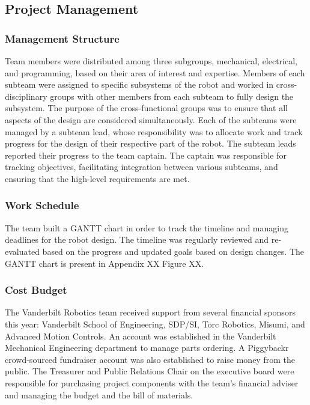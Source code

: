 \documentclass[class=article, crop=false]{standalone}
\begin{document}
	\subsection{Project Management}
	\label{subsec:project_management}
	
	\subsubsection{Management Structure}
	Team members were distributed among three subgroups, mechanical, electrical, and programming, based on their area of interest and expertise. Members of each subteam were assigned to specific subsystems of the robot and worked in cross-disciplinary groups with other members from each subteam to fully design the subsystem. The purpose of the cross-functional groups was to ensure that all aspects of the design are considered simultaneously. Each of the subteams were managed by a subteam lead, whose responsibility was to allocate work and track progress for the design of their respective part of the robot. The subteam leads reported their progress to the team captain. The captain was responsible for tracking objectives, facilitating integration between various subteams, and ensuring that the high-level requirements are met.
	
	\subsubsection{Work Schedule}
	The team built a GANTT chart in order to track the timeline and managing deadlines for the robot design. The timeline was regularly reviewed and re-evaluated based on the progress and updated goals based on design changes. The GANTT chart is present in Appendix XX Figure XX.
	
	\subsubsection{Cost Budget}
	
	The Vanderbilt Robotics team received support from several financial sponsors this year: Vanderbilt School of Engineering, SDP/SI, Torc Robotics, Misumi, and Advanced Motion Controls. An account was established in the Vanderbilt Mechanical Engineering department to manage parts ordering. A Piggybackr crowd-sourced fundraiser account was also established to raise money from the public. The Treasurer and Public Relations Chair on the executive board were responsible for purchasing project components with the team’s financial adviser and managing the budget and the bill of materials. 
	
\end{document}

